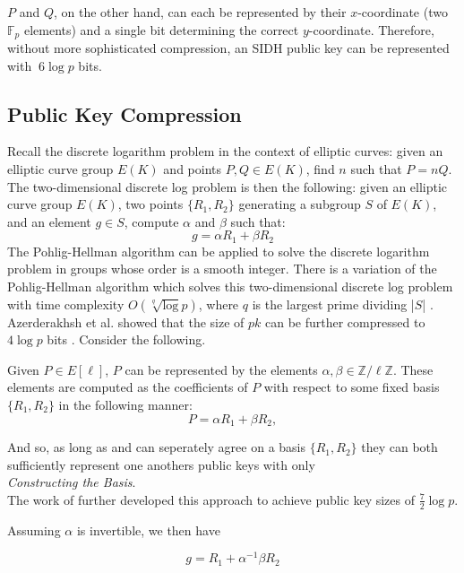 $P$ and $Q$, on the other hand, can each be represented by their $x$-coordinate (two $\mathbb{F}_{p}$ elements) and a single bit determining the correct $y$-coordinate. Therefore, without more sophisticated compression, an SIDH public key can be represented with $~6\log p$ bits.

\subsection{Public Key Compression}

Recall the discrete logarithm problem in the context of elliptic curves: given an elliptic curve group $E(K)$ and points $P, Q \in E(K)$, find $n$ such that $P = nQ$. The two-dimensional discrete log problem is then the following: given an elliptic curve group $E(K)$, two points $\{R_1, R_2\}$ generating a subgroup $S$ of $E(K)$, and an element $g \in S$, compute $\alpha$ and $\beta$ such that:
$$
g = \alpha R_1 + \beta R_2
$$
The Pohlig-Hellman algorithm can be applied to solve the discrete logarithm problem in groups whose order is a smooth integer. There is a variation of the Pohlig-Hellman algorithm which solves this two-dimensional discrete log problem with time complexity $O(\sqrt[q]\log p)$, where $q$ is the largest prime dividing |$S$| \cite{compwr}.\\

Azerderakhsh et al. showed that the size of $pk$ can be further compressed to $4\log p$ bits \cite{compwr}. Consider the following.

Given $P \in E[\ell]$, $P$ can be represented by the elements $\alpha, \beta \in \mathbb{Z}/\ell\mathbb{Z}$. These elements are computed as the coefficients of $P$ with respect to some fixed basis $\{R_1, R_2\}$ in the following manner: 
$$
P = \alpha R_1 + \beta R_2,
$$

And so, as long as \alice and \bob can seperately agree on a basis $\{R_1, R_2\}$ they can both sufficiently represent one anothers public keys with only\\

\noindent
\textit{Constructing the Basis}.\\



The work of \cite{pkcomp} further developed this approach to achieve public key sizes of $\frac{7}{2}\log p$. 

Assuming $\alpha$ is invertible, we then have

$$
g = R_1 + \alpha^{-1}\beta R_2
$$



